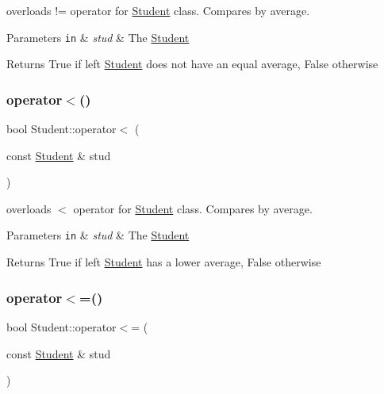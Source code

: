 overloads != operator for \mbox{\hyperlink{class_student}{Student}} class. Compares by average. 


\begin{DoxyParams}[1]{Parameters}
\mbox{\tt in}  & {\em stud} & The \mbox{\hyperlink{class_student}{Student}}\\
\hline
\end{DoxyParams}
\begin{DoxyReturn}{Returns}
True if left \mbox{\hyperlink{class_student}{Student}} does not have an equal average, False otherwise 
\end{DoxyReturn}
\mbox{\label{class_student_acd100733dd2521ea46c739cbafa727f6}} 
\subsubsection{\texorpdfstring{operator$<$()}{operator<()}}
{\footnotesize\ttfamily bool Student\+::operator$<$ (\begin{DoxyParamCaption}\item[{const \mbox{\hyperlink{class_student}{Student}} \&}]{stud }\end{DoxyParamCaption})\hspace{0.3cm}{\ttfamily [inline]}}



overloads $<$ operator for \mbox{\hyperlink{class_student}{Student}} class. Compares by average. 


\begin{DoxyParams}[1]{Parameters}
\mbox{\tt in}  & {\em stud} & The \mbox{\hyperlink{class_student}{Student}}\\
\hline
\end{DoxyParams}
\begin{DoxyReturn}{Returns}
True if left \mbox{\hyperlink{class_student}{Student}} has a lower average, False otherwise 
\end{DoxyReturn}
\mbox{\label{class_student_a26ac75f112a5103217cf31e7bd8d6e9c}} 
\subsubsection{\texorpdfstring{operator$<$=()}{operator<=()}}
{\footnotesize\ttfamily bool Student\+::operator$<$= (\begin{DoxyParamCaption}\item[{const \mbox{\hyperlink{class_student}{Student}} \&}]{stud }\end{DoxyParamCaption})\hspace{0.3cm}{\ttfamily [inline]}}



